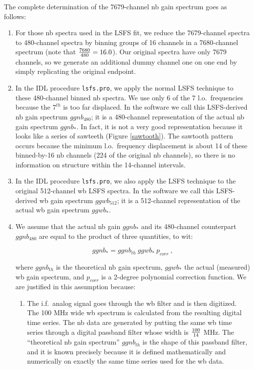 \documentclass[psfig,preprint]{aastex}
\begin{document}
	The complete determination of the 7679-channel nb gain spectrum
goes as follows: \begin{enumerate}

	\item For those nb spectra used in the LSFS fit, we reduce the
7679-channel spectra to 480-channel spectra by binning groups of 16
channels in a 7680-channel spectrum (note that ${7680 \over 480} =
16.0$). Our original spectra have only 7679 channels, so we generate an
additional dummy channel  one on one end by simply replicating the
original endpoint.

	\item In the IDL procedure \verb$lsfs.pro$, we apply the normal
LSFS technique to these 480-channel binned nb spectra. We use only 6 of
the 7 l.o.\ frequencies because the $7^{th}$ is too far displaced. In
the software we call this LSFS-derived nb gain spectrum $ggnb_{480}$; it
is a 480-channel representation of the actual nb gain spectrum $ggnb_*$.
In fact, it is not a very good representation because it looks like a
series of sawteeth (Figure \ref{sawtooth}). The sawtooth pattern occurs
because the minimum l.o.\ frequency displacement is about 14 of these
binned-by-16 nb channels (224 of the original nb channels), so there is
no information on structure within the 14-channel intervals.

	\item In the IDL procedure \verb$lsfs.pro$, we also apply the
LSFS technique to the original 512-channel wb LSFS spectra. In the
software we call this LSFS-derived wb gain spectrum $ggwb_{512}$; it is
a 512-channel representation of the actual wb gain spectrum $ggwb_*$.

	\item We assume that the actual nb gain $ggnb_*$ and its
480-channel counterpart $ggnb_{480}$
are equal to the product of three quantities, to wit: 

\begin{equation}
ggnb_* = ggnb_{th} \ ggwb_* \ p_{corr} \ ,
\end{equation}

\noindent where $ggnb_{th}$ is the theoretical nb gain spectrum,
$ggwb_*$ the actual (measured) wb gain spectrum, and $p_{corr}$ is a
2-degree polynomial correction function. We are justified in this
assumption because: \begin{enumerate}

	\item The i.f.\ analog signal goes through the wb filter and is
then digitized. The 100 MHz wide wb spectrum is calculated from the
resulting digital time series. The nb data are generated by putting the
same wb time series through a digital passband filter whose width is
${100 \over 14}$ MHz. The ``theoretical nb gain spectrum'' $ggnb_{th}$ is
the shape of this passband filter, and it is known precisely because it
is defined mathematically and numerically on exactly the same time
series used for the wb data. 


\end{enumerate}
\end{enumerate}
\end{document}

